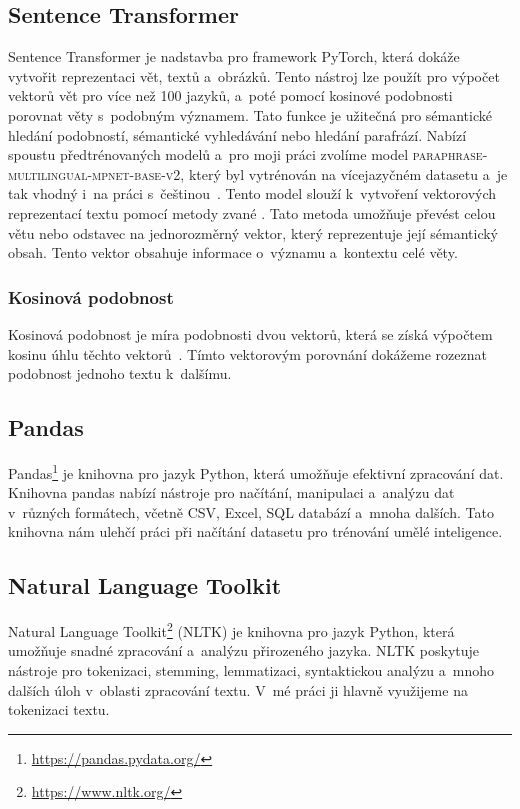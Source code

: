 \subsection{Sentence Transformer}
Sentence Transformer je nadstavba pro framework PyTorch, která dokáže vytvořit reprezentaci vět, textů a~obrázků. Tento nástroj lze použít pro výpočet vektorů vět pro více než 100 jazyků, a~poté pomocí kosinové podobnosti porovnat věty s~podobným významem. Tato funkce je užitečná pro sémantické hledání podobností, sémantické vyhledávání nebo hledání parafrází. Nabízí spoustu předtrénovaných modelů a~pro moji práci zvolíme model \textsc{paraphrase-multilingual-mpnet-base-v2}, který byl vytrénován na vícejazyčném datasetu a~je tak vhodný i~na práci s~češtinou~\cite{sentencetransformer}.
Tento model slouží k~vytvoření vektorových reprezentací textu pomocí metody zvané . Tato metoda umožňuje převést celou větu nebo odstavec na jednorozměrný vektor, který reprezentuje její sémantický obsah. Tento vektor obsahuje informace o~významu a~kontextu celé věty.
\subsubsection{Kosinová podobnost}
Kosinová podobnost je míra podobnosti dvou vektorů, která se získá výpočtem kosinu úhlu těchto vektorů~\cite{waelhgomaa_2013_a}. Tímto vektorovým porovnání dokážeme rozeznat podobnost jednoho textu k~dalšímu.

\subsection{Pandas}
Pandas\footnote{\url{https://pandas.pydata.org/}} je knihovna pro jazyk Python, která umožňuje efektivní zpracování dat. Knihovna pandas nabízí nástroje pro načítání, manipulaci a~analýzu dat v~různých formátech, včetně CSV, Excel, SQL databází a~mnoha dalších. Tato knihovna nám ulehčí práci při načítání datasetu pro trénování umělé inteligence.

\subsection{Natural Language Toolkit}
Natural Language Toolkit\footnote{\url{https://www.nltk.org/}} (NLTK) je knihovna pro jazyk Python, která umožňuje snadné zpracování a~analýzu přirozeného jazyka. NLTK poskytuje nástroje pro tokenizaci, stemming, lemmatizaci, syntaktickou analýzu a~mnoho dalších úloh v~oblasti zpracování textu. V~mé práci ji hlavně využijeme na tokenizaci textu.

